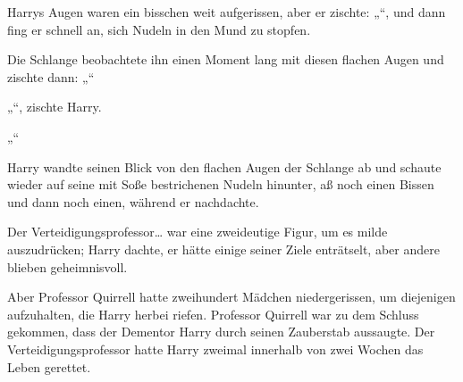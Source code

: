 Harrys Augen waren ein bisschen weit aufgerissen, aber er zischte: „“, und dann fing er schnell an, sich Nudeln in den Mund zu stopfen.

Die Schlange beobachtete ihn einen Moment lang mit diesen flachen Augen und zischte dann: „“

„“, zischte Harry.

„“

Harry wandte seinen Blick von den flachen Augen der Schlange ab und schaute wieder auf seine mit Soße bestrichenen Nudeln hinunter, aß noch einen Bissen und dann noch einen, während er nachdachte.

Der Verteidigungsprofessor… war eine zweideutige Figur, um es milde auszudrücken; Harry dachte, er hätte einige seiner Ziele enträtselt, aber andere blieben geheimnisvoll.

Aber Professor Quirrell hatte zweihundert Mädchen niedergerissen, um diejenigen aufzuhalten, die Harry herbei riefen. Professor Quirrell war zu dem Schluss gekommen, dass der Dementor Harry durch seinen Zauberstab aussaugte. Der Verteidigungsprofessor hatte Harry zweimal innerhalb von zwei Wochen das Leben gerettet.

